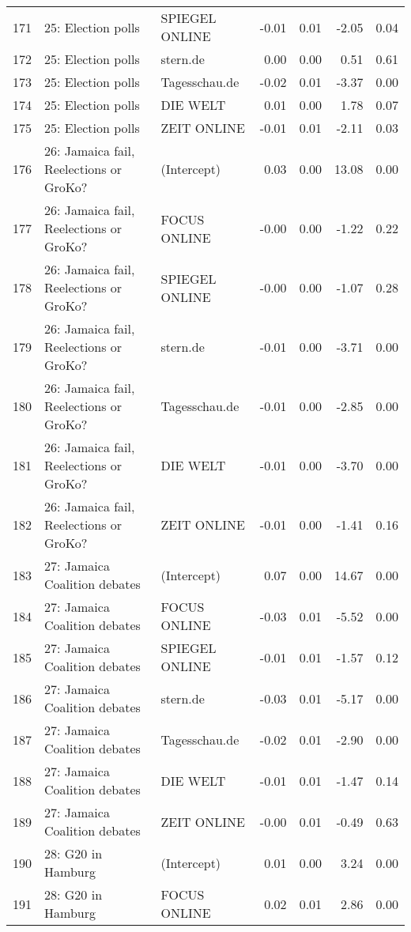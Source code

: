 \begin{table}[ht]
{\begin{tabular}{rllrrrr}
  171 & 25: Election polls & SPIEGEL ONLINE & -0.01 & 0.01 & -2.05 & 0.04 \\ 
  172 & 25: Election polls & stern.de & 0.00 & 0.00 & 0.51 & 0.61 \\ 
  173 & 25: Election polls & Tagesschau.de & -0.02 & 0.01 & -3.37 & 0.00 \\ 
  174 & 25: Election polls & DIE WELT & 0.01 & 0.00 & 1.78 & 0.07 \\ 
  175 & 25: Election polls & ZEIT ONLINE & -0.01 & 0.01 & -2.11 & 0.03 \\ 
  176 & 26: Jamaica fail, Reelections or GroKo? & (Intercept) & 0.03 & 0.00 & 13.08 & 0.00 \\ 
  177 & 26: Jamaica fail, Reelections or GroKo? & FOCUS ONLINE & -0.00 & 0.00 & -1.22 & 0.22 \\ 
  178 & 26: Jamaica fail, Reelections or GroKo? & SPIEGEL ONLINE & -0.00 & 0.00 & -1.07 & 0.28 \\ 
  179 & 26: Jamaica fail, Reelections or GroKo? & stern.de & -0.01 & 0.00 & -3.71 & 0.00 \\ 
  180 & 26: Jamaica fail, Reelections or GroKo? & Tagesschau.de & -0.01 & 0.00 & -2.85 & 0.00 \\ 
  181 & 26: Jamaica fail, Reelections or GroKo? & DIE WELT & -0.01 & 0.00 & -3.70 & 0.00 \\ 
  182 & 26: Jamaica fail, Reelections or GroKo? & ZEIT ONLINE & -0.01 & 0.00 & -1.41 & 0.16 \\ 
  183 & 27: Jamaica Coalition debates & (Intercept) & 0.07 & 0.00 & 14.67 & 0.00 \\ 
  184 & 27: Jamaica Coalition debates & FOCUS ONLINE & -0.03 & 0.01 & -5.52 & 0.00 \\ 
  185 & 27: Jamaica Coalition debates & SPIEGEL ONLINE & -0.01 & 0.01 & -1.57 & 0.12 \\ 
  186 & 27: Jamaica Coalition debates & stern.de & -0.03 & 0.01 & -5.17 & 0.00 \\ 
  187 & 27: Jamaica Coalition debates & Tagesschau.de & -0.02 & 0.01 & -2.90 & 0.00 \\ 
  188 & 27: Jamaica Coalition debates & DIE WELT & -0.01 & 0.01 & -1.47 & 0.14 \\ 
  189 & 27: Jamaica Coalition debates & ZEIT ONLINE & -0.00 & 0.01 & -0.49 & 0.63 \\ 
  190 & 28: G20 in Hamburg & (Intercept) & 0.01 & 0.00 & 3.24 & 0.00 \\ 
  191 & 28: G20 in Hamburg & FOCUS ONLINE & 0.02 & 0.01 & 2.86 & 0.00 \\ 

\end{tabular}}
\end{table}
